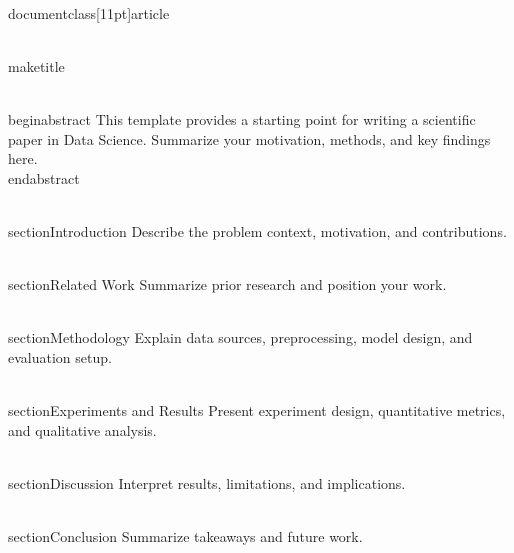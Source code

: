 \\documentclass[11pt]{article}
\begin{document}
\\maketitle

\\begin{abstract}
This template provides a starting point for writing a scientific paper in Data Science.
Summarize your motivation, methods, and key findings here.
\\end{abstract}

\\section{Introduction}
Describe the problem context, motivation, and contributions.

\\section{Related Work}
Summarize prior research and position your work.

\\section{Methodology}
Explain data sources, preprocessing, model design, and evaluation setup.

\\section{Experiments and Results}
Present experiment design, quantitative metrics, and qualitative analysis.

\\section{Discussion}
Interpret results, limitations, and implications.

\\section{Conclusion}
Summarize takeaways and future work.

\
\

\
\end{document}
